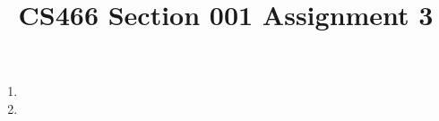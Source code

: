 \documentclass[12pt]{article}
\title{CS466 Section 001 Assignment 3}
\begin{document}
\maketitle

\begin{enumerate}
\item
\item
\end{enumerate}
\end{document}

